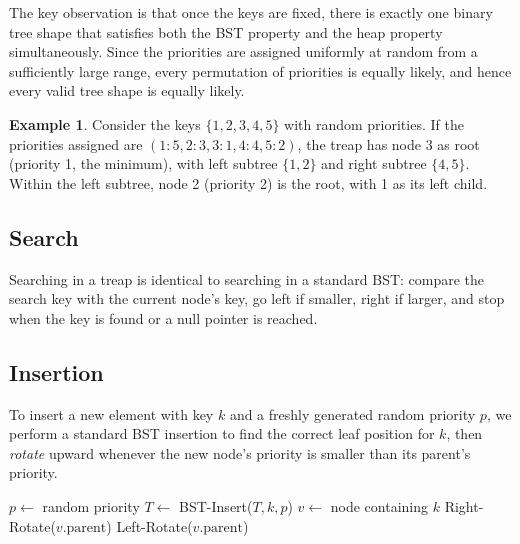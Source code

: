 \documentclass[twoside,12pt]{book}
\theoremstyle{plain}
\theoremstyle{definition}
\newtheorem{example}[theorem]{Example}
\theoremstyle{remark}
\begin{document}
The key observation is that once the keys are fixed, there is exactly one binary tree shape that satisfies both the BST property and the heap property simultaneously. Since the priorities are assigned uniformly at random from a sufficiently large range, every permutation of priorities is equally likely, and hence every valid tree shape is equally likely.

\begin{example}
Consider the keys $\{1, 2, 3, 4, 5\}$ with random priorities. If the priorities assigned are $(1: 5, 2: 3, 3: 1, 4: 4, 5: 2)$, the treap has node 3 as root (priority 1, the minimum), with left subtree $\{1, 2\}$ and right subtree $\{4, 5\}$. Within the left subtree, node 2 (priority 2) is the root, with 1 as its left child.
\end{example}

\subsection{Search}

Searching in a treap is identical to searching in a standard BST: compare the search key with the current node's key, go left if smaller, right if larger, and stop when the key is found or a null pointer is reached.

\begin{algorithm}[H]
\caption{Treap Search}
\begin{algorithmic}[1]
        \State {}
    \EndIf
        \State {}
        \State {}
    \Else
        \State {}
    \EndIf
\EndFunction
\end{algorithmic}
\end{algorithm}

\subsection{Insertion}

To insert a new element with key $k$ and a freshly generated random priority $p$, we perform a standard BST insertion to find the correct leaf position for $k$, then \emph{rotate} upward whenever the new node's priority is smaller than its parent's priority.

\begin{algorithm}[H]
\caption{Treap Insertion}
\begin{algorithmic}[1]
    \State $p \gets$ random priority
    \State $T \gets$ BST-Insert($T, k, p$)
    \State $v \gets$ node containing $k$
            \State Right-Rotate($v.\text{parent}$)
        \Else
            \State Left-Rotate($v.\text{parent}$)
        \EndIf
    \EndWhile
    \State {}
\EndFunction
\end{algorithmic}
\end{algorithm}
\end{document}
